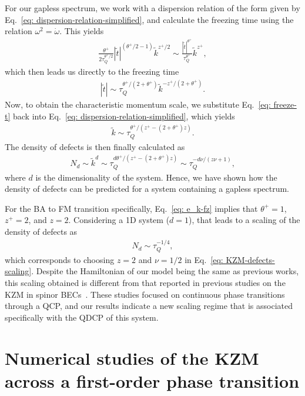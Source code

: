 For our gapless spectrum, we work with a dispersion relation of the form given
by Eq.~\eqref{eq: dispersion-relation-simplified}, and calculate the freezing
time using the relation \(\omega^2 = \dot{\omega}\).
This yields
\begin{align}
    \frac{\theta^+}{2\tau_Q^{\theta^+/2}}|\tilde{t}|^{(\theta^+/2 - 1)}
    \tilde{k}^{z^+/2} \sim \frac{|\tilde{t}|^{\theta^+}}{\tau_Q^{\theta^+}}
    \tilde{k}^{z^+},
\end{align}
which then leads us directly to the freezing time
\begin{align}\label{eq: freeze-t}   
    |\tilde{t}| \sim \tau_Q^{\theta^+/(2+\theta^+)}
    \tilde{k}^{-z^+/(2+\theta^+)}.
\end{align}
Now, to obtain the characteristic momentum scale, we substitute
Eq.~\eqref{eq: freeze-t} back into
Eq.~\eqref{eq: dispersion-relation-simplified}, which yields
\begin{align}
    \tilde{k} \sim \tau_Q^{\theta^+/(z^+-(2+\theta^+)z)}.
\end{align}
The density of defects is then finally calculated as
\begin{align}
    N_d \sim \tilde{k}^d \sim \tau_Q^{d\theta^+/(z^+-(2+\theta^+)z)} \sim
    \tau_Q^{-d\nu/(z\nu + 1)},
\end{align}
where \(d\) is the dimensionality of the system.
Hence, we have shown how the density of defects can be predicted for a system
containing a gapless spectrum.

For the BA to FM transition specifically, Eq.~\eqref{eq: e_k-fz} implies that
\(\theta^+=1\), \(z^+=2\), and \(z = 2\).
Considering a 1D system (\(d = 1\)), that leads to a scaling of the density of
defects as
\begin{align}
    N_d \sim\tau_Q^{-1/4},
\end{align}
which corresponds to choosing \(z=2\) and \(\nu = 1/2\) in
Eq.~\eqref{eq: KZM-defects-scaling}.
Despite the Hamiltonian of our model being the same as previous works, this
scaling obtained is different from that reported in previous studies on the KZM
in spinor BECs~\cite{Damski2007,Saito2007,Saito2007a,Saito2013,Swislocki2013}.
These studies focused on continuous phase transitions through a QCP\@, and our
results indicate a new scaling regime that is associated specifically with the
QDCP of this system.

\section{Numerical studies of the KZM across a first-order phase transition}
